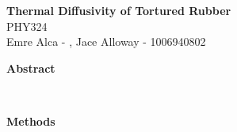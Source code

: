 \documentclass[11pt]{article}
\begin{document}
\begin{center}
    \Large {}  \textbf{Thermal Diffusivity of Tortured Rubber}\\
    \vspace{5pt} 
    \large PHY324\\
    \vspace{5pt}
    Emre Alca - , Jace Alloway - 1006940802
\end{center}

\nd \hrulefill

\vspace{15pt}




 \selectfont \textbf{Abstract}

 \selectfont \lipsum[1]\\



\nd \hrulefill

\vspace{5pt}



\begin{multicols}{2}


     \selectfont \textbf{Methods}
    
     \selectfont \lipsum












\end{multicols}
\end{document}
